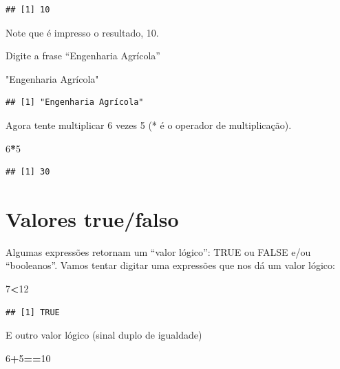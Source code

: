 \documentclass[]{book}
\newenvironment{Shaded}{\begin{snugshade}}{\end{snugshade}}
\newcommand{\DecValTok}[1]{\textcolor[rgb]{0.00,0.00,0.81}{#1}}
\newcommand{\OperatorTok}[1]{\textcolor[rgb]{0.81,0.36,0.00}{\textbf{#1}}}
\newcommand{\StringTok}[1]{\textcolor[rgb]{0.31,0.60,0.02}{#1}}
\begin{document}
\begin{verbatim}
## [1] 10
\end{verbatim}

Note que é impresso o resultado, 10.

Digite a frase ``Engenharia Agrícola''

\begin{Shaded}
\begin{Highlighting}[]
\StringTok{"Engenharia Agrícola"}
\end{Highlighting}
\end{Shaded}

\begin{verbatim}
## [1] "Engenharia Agrícola"
\end{verbatim}

Agora tente multiplicar 6 vezes 5 (* é o operador de multiplicação).

\begin{Shaded}
\begin{Highlighting}[]
\DecValTok{6}\OperatorTok{*}\DecValTok{5}
\end{Highlighting}
\end{Shaded}

\begin{verbatim}
## [1] 30
\end{verbatim}

\hypertarget{valores-truefalso}{%
\section{Valores true/falso}\label{valores-truefalso}}

Algumas expressões retornam um ``valor lógico'': TRUE ou FALSE e/ou ``booleanos''.
Vamos tentar digitar uma expressões que nos dá um valor lógico:

\begin{Shaded}
\begin{Highlighting}[]
\DecValTok{7}\OperatorTok{<}\DecValTok{12}
\end{Highlighting}
\end{Shaded}

\begin{verbatim}
## [1] TRUE
\end{verbatim}

E outro valor lógico (sinal duplo de igualdade)

\begin{Shaded}
\begin{Highlighting}[]
\DecValTok{6}\OperatorTok{+}\DecValTok{5}\OperatorTok{==}\DecValTok{10}
\end{Highlighting}
\end{Shaded}
\end{document}
